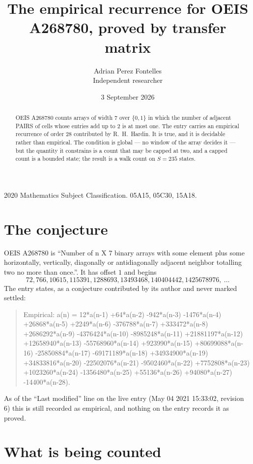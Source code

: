 \documentclass[11pt,a4paper]{article}
\title{The empirical recurrence for OEIS A268780, proved by transfer matrix}
\author{Adrian Perez Fontelles\\ \small Independent researcher}
\date{3 September 2026}
\theoremstyle{plain}
\theoremstyle{definition}
\begin{document}
\maketitle

\begin{abstract}
OEIS A268780 counts arrays of width $7$ over $\{0,1\}$ in which the number of adjacent PAIRS of
cells whose entries add up to $2$ is at most one. The entry carries an empirical recurrence of
order $28$ contributed by R.~H.~Hardin. It is true, and it is decidable rather than
empirical. The condition is global --- no window of the array decides it --- but the quantity
it constrains is a count that may be capped at two, and a capped count is a bounded state; the
result is a walk count on $S=235$ states.
\end{abstract}

\noindent\small 2020 Mathematics Subject Classification. 05A15, 05C30, 15A18.\normalsize

\section{The conjecture}

OEIS A268780 is ``Number of n X 7 binary arrays with some element plus some horizontally, vertically, diagonally or antidiagonally adjacent neighbor totalling two no more than once.''. It has offset $1$ and begins
\[
72, 766, 10615, 115391, 1288693, 13493468, 140404442, 1425678976,\ \dots
\]
The entry states, as a conjecture contributed by its author and never marked settled:
\begin{quote}
Empirical: a(n) = 12*a(n-1) +64*a(n-2) -942*a(n-3) -1476*a(n-4) +26868*a(n-5) +2249*a(n-6) -376788*a(n-7) +333472*a(n-8) +2686292*a(n-9) -4376424*a(n-10) -8985248*a(n-11) +21881197*a(n-12) +12658940*a(n-13) -55768960*a(n-14) +923990*a(n-15) +80699088*a(n-16) -25850884*a(n-17) -69171189*a(n-18) +34934900*a(n-19) +34833816*a(n-20) -22502076*a(n-21) -9502460*a(n-22) +7752808*a(n-23) +1023260*a(n-24) -1356480*a(n-25) +55136*a(n-26) +94080*a(n-27) -14400*a(n-28).
\end{quote}
As of the ``Last modified'' line on the live entry (May 04 2021 15:33:02, revision 6) this is still
recorded as empirical, and nothing on the entry records it as proved.

\section{What is being counted}
\end{document}
